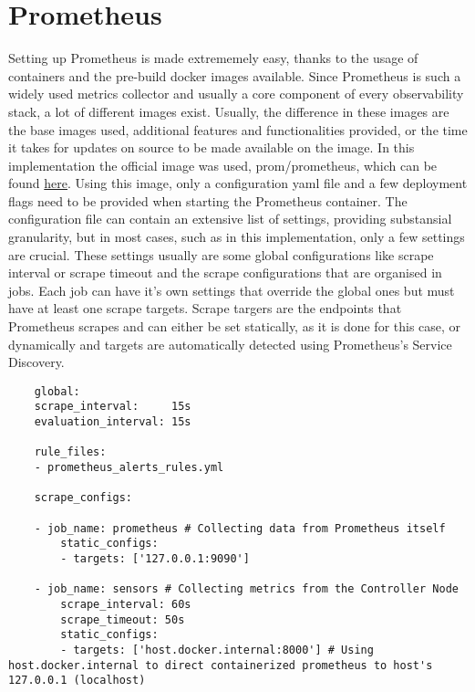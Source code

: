 \section{Prometheus}
Setting up Prometheus is made extrememely easy, thanks to the usage of containers and the pre-build docker images available. Since Prometheus is such a widely used metrics collector and usually a core component of every observability stack, a lot of different images exist.
Usually, the difference in these images are the base images used, additional features and functionalities provided, or the time it takes for updates on source to be made available on the image. In this implementation the official image was used, prom/prometheus, which can be found \href{https://hub.docker.com/r/prom/prometheus}{here}.
Using this image, only a configuration yaml file and a few deployment flags need to be provided when starting the Prometheus container. The configuration file can contain an extensive list of settings, providing substansial granularity, but in most cases, such as in this implementation, only a few settings are crucial. These settings usually are some global configurations like scrape interval or scrape timeout and the scrape configurations that are organised in jobs. Each job can have it's own settings that override the global ones but must have at least one scrape targets. Scrape targers are the endpoints that Prometheus scrapes and can either be set statically, as it is done for this case, or dynamically and targets are automatically detected using Prometheus's Service Discovery.

\begin{verbatim}
    global:
    scrape_interval:     15s
    evaluation_interval: 15s

    rule_files:
    - prometheus_alerts_rules.yml

    scrape_configs:

    - job_name: prometheus # Collecting data from Prometheus itself
        static_configs:
        - targets: ['127.0.0.1:9090']

    - job_name: sensors # Collecting metrics from the Controller Node
        scrape_interval: 60s
        scrape_timeout: 50s
        static_configs:
        - targets: ['host.docker.internal:8000'] # Using host.docker.internal to direct containerized prometheus to host's 127.0.0.1 (localhost)
\end{verbatim}

